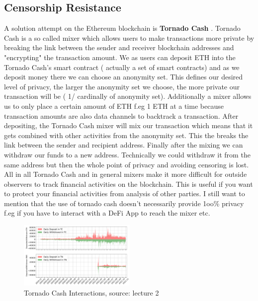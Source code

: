\documentclass{article}
\begin{document}
\subsection{Censorship Resistance}
A solution attempt on the Ethereum blockchain is \textbf{Tornado Cash} . Tornado Cash is a so called mixer which allows users to make transactions more private by breaking the link between the sender and receiver blockchain addresses and "encrypting" the transaction amount. We as users can deposit ETH into the Tornado Cash's smart contract ( actually a set of smart contracts) and as we deposit money there we can choose an anonymity set. This defines our desired level of privacy, the larger the anonymity set we choose, the more private our transaction will be ( 1/ cardinally of anonymity set). Additionally a mixer allows us to only place a certain amount of ETH f.eg 1 ETH  at a time because transaction amounts are also data channels to backtrack a transaction. After depositing, the Tornado Cash mixer will mix our transaction which means that it gets combined with other activities from the anonymity set. This the breaks the link between the sender and recipient address. Finally after the mixing we can withdraw our funds to a new address. Technically we could withdraw it from the same address but then the whole point of privacy and avoiding censoring is lost. All in all Tornado Cash and in general mixers make it more difficult for outside observers to track financial activities on the blockchain. This is useful if you want to  protect your financial activities from analysis of other parties. I still want to mention that the use of tornado  cash doesn't necessarily provide 1oo\% privacy f.eg if you have to interact with a DeFi App to reach the mixer etc.
\begin{figure}[h]
    \centering
    \includegraphics[width=0.5\textwidth]{tc.png} %
    \caption{Tornado Cash Interactions, \scriptsize{source: lecture 2}}
    \label{fig:image-example}
\end{figure}
\end{document}
